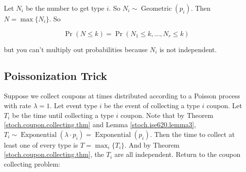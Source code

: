 \begin{example}
\begin{solution}
\end{solution}

\begin{solution}


Let \(N_i\) be the number to get type \(i\). So \(N_i \sim \operatorname{Geometric}(p_i)\). Then \(N = \max \{N_i \}\). So 

\[
\Pr(N \leq k) = \Pr(N_1 \leq k, \ldots, N_r \leq k) 
\]

but you can't multiply out probabilities because \(N_i\) is not independent. 

\end{solution}

%


\end{example}

\subsection{Poissonization Trick}

Suppose we collect coupons at times distributed according to a Poisson process with rate \(\lambda=1\). Let event type \(i\) be the event of collecting a type \(i\) coupon. Let \(T_i\) be the time until collecting a type \(i\) coupon. Note that by Theorem \ref{stoch.coupon.collecting.thm} and Lemma \ref{stoch.ise620.lemma3}, \(T_i \sim \operatorname{Exponential}(\lambda \cdot p_i) =\operatorname{Exponential}( p_i) \). Then the time to collect at least one of every type is \(T = \max_i \{ T_i\}\). And by Theorem \ref{stoch.coupon.collecting.thm}, the \(T_i\) are all independent. Return to the coupon collecting problem:

